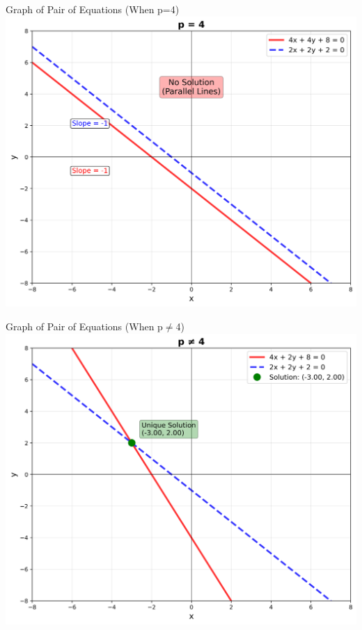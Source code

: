 \documentclass{beamer}
\begin{document}
\begin{frame}{Graph of Pair of Equations (When p=4)}
   \centering
    \includegraphics[width=\columnwidth, height=0.8\textheight, keepaspectratio]{figs/fig1.png}
    \label{fig:Beamer/figs/fig1.png}
\end{frame}

\begin{frame}{Graph of Pair of Equations (When p$\neq$4)}
   \centering
    \includegraphics[width=\columnwidth, height=0.8\textheight, keepaspectratio]{figs/fig2.png}
    \label{fig:Beamer/figs/fig2.png}
\end{frame}
\end{document}
